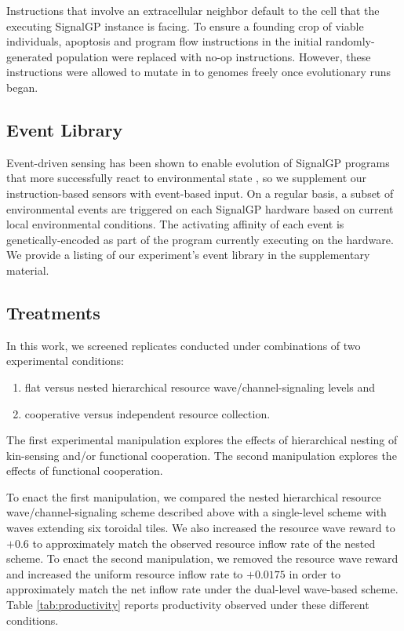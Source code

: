 Instructions that involve an extracellular neighbor default to the cell that the executing SignalGP instance is facing.
To ensure a founding crop of viable individuals, apoptosis and program flow instructions in the initial randomly-generated population were replaced with no-op instructions.
However, these instructions were allowed to mutate in to genomes freely once evolutionary runs began.

\subsection{Event Library}

Event-driven sensing has been shown to enable evolution of SignalGP programs that more successfully react to  environmental state \cite{lalejini2018evolving}, so we supplement our instruction-based sensors with event-based input.
On a regular basis, a subset of environmental events are triggered on each SignalGP hardware based on current local environmental conditions.
The activating affinity of each event is genetically-encoded as part of the program currently executing on the hardware.
We provide a listing of our experiment's event library in the supplementary material.

\subsection{Treatments}

In this work, we screened replicates conducted under combinations of two experimental conditions:
\begin{enumerate}
\item flat versus nested hierarchical resource wave/channel-signaling levels and
\item cooperative versus independent resource collection.
\end{enumerate}

The first experimental manipulation explores the effects of hierarchical nesting of kin-sensing and/or functional cooperation.
The second manipulation explores the effects of functional cooperation.

To enact the first manipulation, we compared the nested hierarchical resource wave/channel-signaling scheme described above with a single-level scheme with waves extending six toroidal tiles.
We also increased the resource wave reward to $+0.6$ to approximately match the observed resource inflow rate of the nested scheme.
To enact the second manipulation, we removed the resource wave reward and increased the uniform resource inflow rate to $+0.0175$ in order to approximately match the net inflow rate under the dual-level wave-based scheme.
Table \ref{tab:productivity} reports productivity observed under these different conditions.

